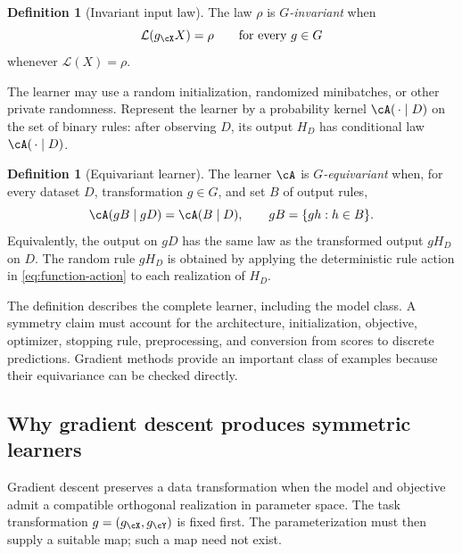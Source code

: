 \documentclass[11pt,twoside]{article}
\newcommand{\Law}{\mathcal L}
\theoremstyle{definition}
\newtheorem{definition}[theorem]{Definition}
\theoremstyle{remark}
\begin{document}
\begin{definition}[Invariant input law]
The law \(\rho\) is \emph{\(G\)-invariant} when
\begin{equation}
 \Law(g_{\cX}X)=\rho
 \qquad\text{for every }g\in G
 \label{eq:invariant-law}
\end{equation}
whenever \(\Law(X)=\rho\).
\end{definition}

The learner may use a random initialization, randomized minibatches, or other
private randomness. Represent the learner by a probability kernel
\(\cA(\,\cdot\mid D)\) on the set of binary rules: after observing \(D\), its
output \(H_D\) has conditional law \(\cA(\,\cdot\mid D)\).

\begin{definition}[Equivariant learner]
The learner \(\cA\) is \emph{\(G\)-equivariant} when, for every dataset
\(D\), transformation \(g\in G\), and set \(B\) of output rules,
\begin{equation}
 \cA(gB\mid gD)=\cA(B\mid D),
 \qquad gB=\{gh:h\in B\}.
 \label{eq:learner-equivariance}
\end{equation}
Equivalently, the output on \(gD\) has the same law as the transformed output
\(gH_D\) on \(D\). The random rule \(gH_D\) is obtained by applying the
deterministic rule action in \cref{eq:function-action} to each realization of
\(H_D\).
\end{definition}

The definition describes the complete learner, including the model class. A
symmetry claim must account for the architecture, initialization, objective,
optimizer, stopping rule, preprocessing, and conversion from scores to
discrete predictions. Gradient methods provide an important class of examples
because their equivariance can be checked directly.

\subsection{Why gradient descent produces symmetric learners}
\label{sec:gradient-symmetry}

Gradient descent preserves a data transformation when the model and objective
admit a compatible orthogonal realization in parameter space. The task
transformation \(g=(g_{\cX},g_{\cY})\) is fixed first. The parameterization
must then supply a suitable map; such a map need not exist.
\end{document}
